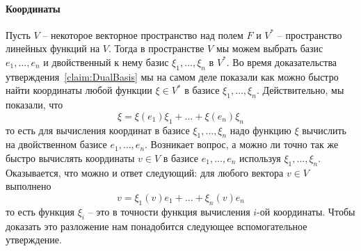\paragraph{Координаты}

Пусть $V$ -- некоторое векторное пространство над полем $F$ и $V^*$ -- пространство линейных функций на $V$.
Тогда в пространстве $V$ мы можем выбрать базис $e_1,\ldots,e_n$ и двойственный к нему базис $\xi_1,\ldots, \xi_n$ в $V^*$.
Во время доказательства утверждения~\ref{claim:DualBasis} мы на самом деле показали как можно быстро найти координаты любой функции $\xi \in V^*$ в базисе $\xi_1,\ldots, \xi_n$.
Действительно, мы показали, что
\[
\xi = \xi(e_1) \xi_1 + \ldots + \xi(e_n) \xi_n
\]
то есть для вычисления координат в базисе $\xi_1,\ldots, \xi_n$ надо функцию $\xi$ вычислить на двойственном базисе $e_1,\ldots, e_n$.
Возникает вопрос, а можно ли точно так же быстро вычислять координаты $v\in V$ в базисе $e_1,\ldots, e_n$ используя $\xi_1,\ldots, \xi_n$.
Оказывается, что можно и ответ следующий: для любого вектора $v\in V$ выполнено
\[
v = \xi_1(v) e_1 + \ldots + \xi_n(v) e_n
\]
то есть функция $\xi_i$ -- это в точности функция вычисления $i$-ой координаты.
Чтобы доказать это разложение нам понадобится следующее вспомогательное утверждение.

